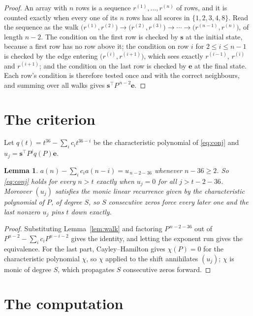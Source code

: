 \documentclass[11pt,a4paper]{article}
\theoremstyle{plain}
\newtheorem{lemma}[theorem]{Lemma}
\theoremstyle{definition}
\begin{document}
\begin{proof}
An array with $n$ rows is a sequence $r^{(1)},\dots,r^{(n)}$ of rows, and it is counted
exactly when every one of its $n$ rows has all scores in $\{1,2,3,4,8\}$. Read the sequence as the
walk $\bigl(r^{(1)},r^{(2)}\bigr)\to\bigl(r^{(2)},r^{(3)}\bigr)\to\cdots\to
\bigl(r^{(n-1)},r^{(n)}\bigr)$, of length $n-2$. The condition on the first row is
checked by $\mathbf{s}$ at the initial state, because a first row has no row above it; the
condition on row $i$ for $2\le i\le n-1$ is checked by the edge entering
$\bigl(r^{(i)},r^{(i+1)}\bigr)$, which sees exactly $r^{(i-1)}$, $r^{(i)}$ and
$r^{(i+1)}$; and the condition on the last row is checked by $\mathbf{e}$ at the final
state. Each row's condition is therefore tested once and with the correct neighbours, and
summing over all walks gives $\mathbf{s}^{\!\top}P^{\,n-2}\mathbf{e}$.
\end{proof}

\section{The criterion}

Let $q(t)=t^{36}-\sum_i c_i t^{36-i}$ be the characteristic polynomial of
\eqref{eq:conj} and $u_j=\mathbf{s}^{\!\top}P^{j}q(P)\mathbf{e}$.

\begin{lemma}\label{lem:crit}
$a(n)-\sum_i c_i a(n-i)=u_{\,n-2-36}$ whenever $n-36\ge2$. So \eqref{eq:conj}
holds for every $n>t$ exactly when $u_j=0$ for all $j>t-2-36$. Moreover $(u_j)$
satisfies the monic linear recurrence given by the characteristic polynomial of $P$, of
degree $S$, so $S$ consecutive zeros force every later one and the last nonzero $u_j$ pins
$t$ down exactly.
\end{lemma}

\begin{proof}
Substituting Lemma~\ref{lem:walk} and factoring $P^{\,n-2-36}$ out of
$P^{n-2}-\sum_i c_i P^{n-i-2}$ gives the identity, and letting the exponent run gives the
equivalence. For the last part, Cayley--Hamilton gives $\chi(P)=0$ for the characteristic
polynomial $\chi$, so $\chi$ applied to the shift annihilates $(u_j)$; $\chi$ is monic of
degree $S$, which propagates $S$ consecutive zeros forward.
\end{proof}

\section{The computation}
\end{document}
